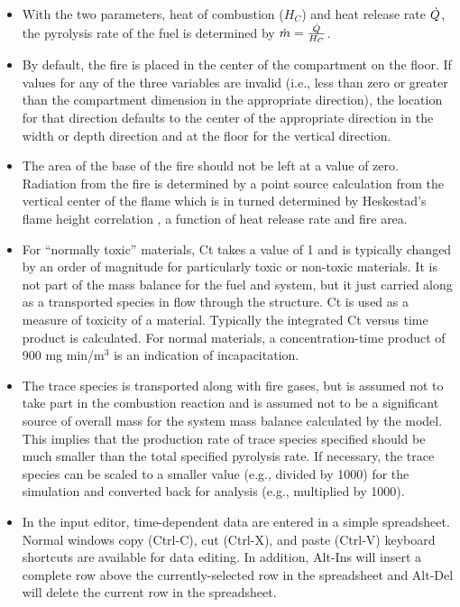 \begin{itemize}
\item With the two parameters, heat of combustion ($H_C$) and heat release rate $\dot{Q}$, the pyrolysis rate of the fuel is determined by $\dot{m}=\frac{\dot{Q}}{H_C}$.
\item By default, the fire is placed in the center of the compartment on the floor.  If values for any of the three variables are invalid (i.e., less than zero or greater than the compartment dimension in the appropriate direction), the location for that direction defaults to the center of the appropriate direction in the width or depth direction and at the floor for the vertical direction.
\item The area of the base of the fire should not be left at a value of zero. Radiation from the fire is determined by a point source calculation from the vertical center of the flame which is in turned determined by Heskestad's flame height correlation \cite{Heskestad:2002}, a function of heat release rate and fire area.
\item For “normally toxic” materials, Ct takes a value of 1 and is typically changed by an order of magnitude for particularly toxic or non-toxic materials.  It is not part of the mass balance for the fuel and system, but it just carried along as a transported species in flow through the structure. Ct is used as a measure of toxicity of a material.  Typically the integrated Ct versus time product is calculated. For normal materials, a concentration-time product of 900 mg min/m$^3$ is an indication of incapacitation.
\item The trace species is transported along with fire gases, but is assumed not to take part in the combustion reaction and is assumed not to be a significant source of overall mass for the system mass balance calculated by the model. This implies that the production rate of trace species specified should be much smaller than the total specified pyrolysis rate. If necessary, the trace species can be scaled to a smaller value (e.g., divided by 1000) for the simulation and converted back for analysis (e.g., multiplied by 1000).
\item In the input editor, time-dependent data are entered in a simple spreadsheet. Normal windows copy (Ctrl-C), cut (Ctrl-X), and paste (Ctrl-V) keyboard shortcuts are available for data editing. In addition, Alt-Ins will insert a complete row above the currently-selected row in the spreadsheet and Alt-Del will delete the current row in the spreadsheet.
\end{itemize}


